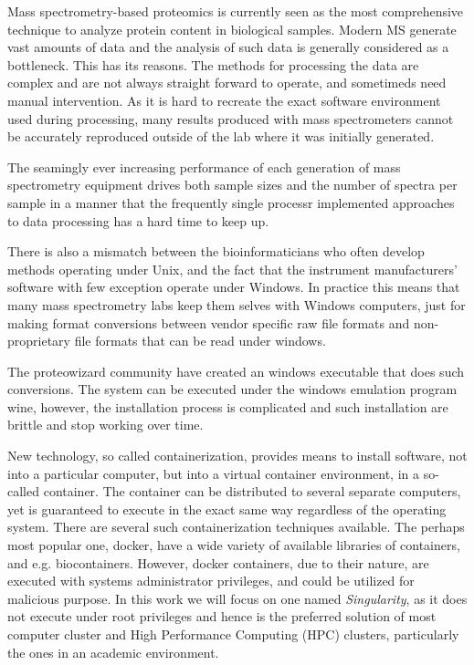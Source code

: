 \documentclass[11pt]{article}
\begin{document}
Mass spectrometry-based proteomics is currently seen as the most comprehensive technique to analyze protein content in biological samples. Modern MS generate vast amounts of data and the analysis of such data is generally considered as a bottleneck. This has its reasons. The methods for processing the data are complex and are not always straight forward to operate, and sometimeds need manual intervention. As it is hard to recreate the exact software environment used during processing, many results produced with mass spectrometers cannot be accurately reproduced outside of the lab where it was initially generated.

The seamingly ever increasing performance of each generation of mass spectrometry equipment drives both sample sizes and the number of spectra per sample in a manner that the frequently single processr implemented approaches to data processing has a hard time to keep up.

There is also a mismatch between the bioinformaticians who often develop methods operating under Unix, and the fact that the instrument manufacturers' software with few exception operate under Windows. In practice this means that many mass spectrometry labs keep them selves with Windows computers, just for making format conversions between vendor specific raw file formats and non-proprietary file formats that can be read under windows.

The proteowizard community have created an windows executable that does such conversions. The system can be executed under the windows emulation program wine, however, the installation process is complicated and such installation are brittle and stop working over time.

New technology, so called containerization, provides means to install software, not into a particular computer, but into a virtual container environment, in a so-called container. The container can be distributed to several separate computers, yet is guaranteed to execute in the exact same way regardless of the operating system. There are several such containerization techniques available. The perhaps most popular one, docker, have a wide variety of available libraries of containers, and e.g. biocontainers\cite{}. However, docker containers, due to their nature, are executed with systems administrator privileges, and could be utilized for malicious purpose.  In this work we will focus on one named \textit{Singularity}, as it does not execute under root privileges and hence is the preferred solution of most computer cluster and High Performance Computing (HPC) clusters, particularly the ones in an academic environment.
\end{document}

